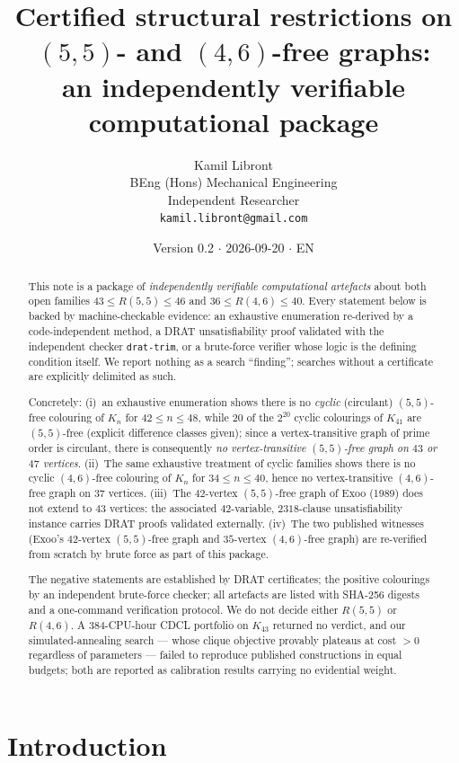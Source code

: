 \documentclass[11pt]{article}
\title{Certified structural restrictions on $(5,5)$- and $(4,6)$-free graphs:\\
an independently verifiable computational package}
\author{Kamil Libront\\[2pt]
\small BEng (Hons) Mechanical Engineering\\
\small Independent Researcher\\
\small \texttt{kamil.libront@gmail.com}
}
\date{Version 0.2 $\cdot$ 2026-09-20 $\cdot$ EN}
\theoremstyle{definition}
\theoremstyle{plain}
\newcommand{\K}{\ensuremath{K}}
\newcommand{\R}[2]{\ensuremath{R(#1,#2)}}
\begin{document}
\maketitle

\begin{abstract}
This note is a package of \emph{independently verifiable computational
artefacts} about both open families $43 \le \R{5}{5} \le 46$ and
$36 \le \R{4}{6} \le 40$. Every statement below is backed by machine-checkable
evidence: an exhaustive enumeration re-derived by a code-independent method, a
DRAT unsatisfiability proof validated with the independent checker
\texttt{drat-trim}, or a brute-force verifier whose logic is the defining
condition itself. We report nothing as a search ``finding''; searches without a
certificate are explicitly delimited as such.

Concretely: (i)~an exhaustive enumeration shows there is no \emph{cyclic}
(circulant) $(5,5)$-free colouring of $\K_n$ for $42 \le n \le 48$, while
$20$ of the $2^{20}$ cyclic colourings of $\K_{41}$ are $(5,5)$-free (explicit
difference classes given); since a vertex-transitive graph of prime order is
circulant, there is consequently \emph{no vertex-transitive $(5,5)$-free
graph on $43$ or $47$ vertices}. (ii)~The same exhaustive treatment of cyclic
families shows there is no cyclic $(4,6)$-free colouring of $\K_n$ for
$34 \le n \le 40$, hence no vertex-transitive $(4,6)$-free graph on $37$
vertices. (iii)~The $42$-vertex $(5,5)$-free graph of Exoo (1989) does not
extend to $43$ vertices: the associated $42$-variable, $2318$-clause
unsatisfiability instance carries DRAT proofs validated externally.
(iv)~The two published witnesses (Exoo's $42$-vertex $(5,5)$-free graph and
$35$-vertex $(4,6)$-free graph) are re-verified from scratch by brute force as
part of this package.

The negative statements are established by DRAT certificates; the positive
colourings by an independent brute-force checker; all artefacts are listed
with SHA-256 digests and a one-command verification protocol. We do not decide
either $\R{5}{5}$ or $\R{4}{6}$. A $384$-CPU-hour CDCL portfolio on $\K_{43}$
returned no verdict, and our simulated-annealing search --- whose clique
objective provably plateaus at cost $>0$ regardless of parameters --- failed
to reproduce published constructions in equal budgets; both are reported as
calibration results carrying no evidential weight.
\end{abstract}

\section{Introduction}
\end{document}
